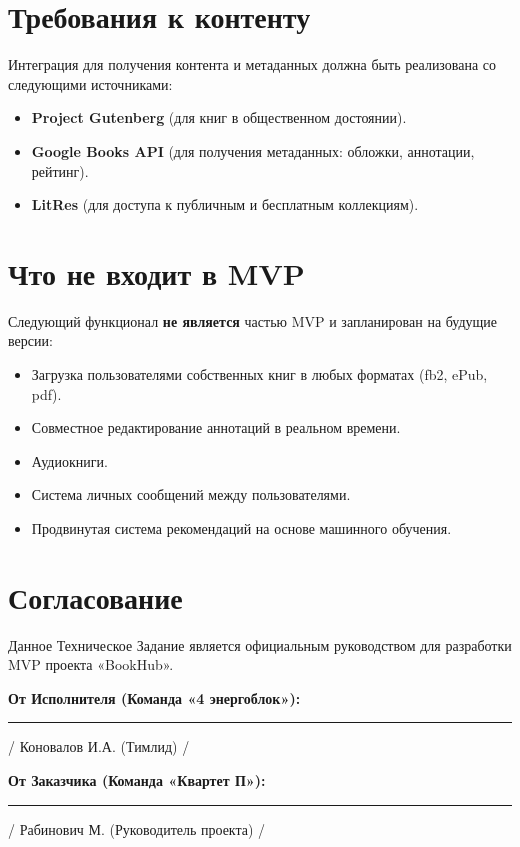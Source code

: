\documentclass[12pt,a4paper]{article}
\begin{document}
\section{Требования к контенту}

Интеграция для получения контента и метаданных должна быть реализована со следующими источниками:

\begin{itemize}
    \item \textbf{Project Gutenberg} (для книг в общественном достоянии).
    \item \textbf{Google Books API} (для получения метаданных: обложки, аннотации, рейтинг).
    \item \textbf{LitRes} (для доступа к публичным и бесплатным коллекциям).
\end{itemize}

\section{Что не входит в MVP}

Следующий функционал \textbf{не является} частью MVP и запланирован на будущие версии:

\begin{itemize}
    \item Загрузка пользователями собственных книг в любых форматах (fb2, ePub, pdf).
    \item Совместное редактирование аннотаций в реальном времени.
    \item Аудиокниги.
    \item Система личных сообщений между пользователями.
    \item Продвинутая система рекомендаций на основе машинного обучения.
\end{itemize}

\section{Согласование}

Данное Техническое Задание является официальным руководством для разработки MVP проекта «BookHub».

\textbf{От Исполнителя (Команда «4 энергоблок»):}

\vspace{2cm}

\rule{5cm}{0.4pt} / Коновалов И.А. (Тимлид) /

\vspace{1cm}

\textbf{От Заказчика (Команда «Квартет П»):}

\vspace{2cm}

\rule{5cm}{0.4pt} / Рабинович М. (Руководитель проекта) /
\end{document}
